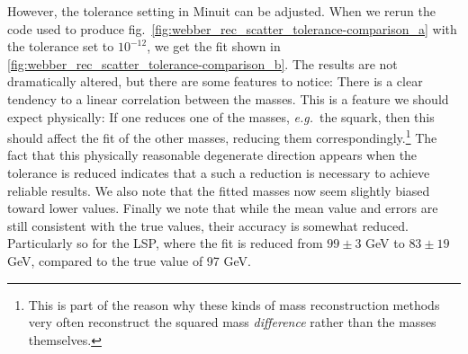 \documentclass[twoside,english]{uiofysmaster}
\begin{document}
However, the tolerance setting in {Minuit} can be adjusted. When we rerun the code used to produce fig.\ \ref{fig:webber_rec_scatter_tolerance-comparison_a} with the tolerance set to $10^{-12}$, we get the fit shown in \ref{fig:webber_rec_scatter_tolerance-comparison_b}. The results are not dramatically altered, but there are some features to notice: There is a clear tendency to a linear correlation between the masses. This is a feature we should expect physically: If one reduces one of the masses, {\it e.g.}\ the squark, then this should affect the fit of the other masses, reducing them correspondingly.\footnote{This is part of the reason why these kinds of mass reconstruction methods very often reconstruct the squared mass {\it difference} rather than the masses themselves.} The fact that this physically reasonable degenerate direction appears when the tolerance is reduced indicates that a such a reduction is necessary to achieve reliable results. We also note that the fitted masses now seem slightly biased toward lower values. Finally we note that while the mean value and errors are still consistent with the true values, their accuracy is somewhat reduced. Particularly so for the LSP, where the fit is reduced from $99 \pm 3$ GeV to $83 \pm 19$ GeV, compared to the true value of 97 GeV.
\end{document}
